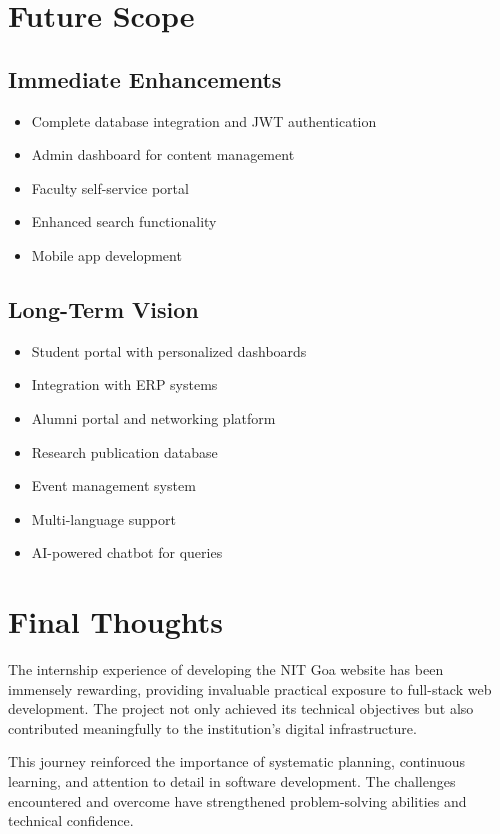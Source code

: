 \documentclass[12pt,a4paper]{report}
\begin{document}
\section{Future Scope}

\subsection*{Immediate Enhancements}
\begin{itemize}
    \item Complete database integration and JWT authentication
    \item Admin dashboard for content management
    \item Faculty self-service portal
    \item Enhanced search functionality
    \item Mobile app development
\end{itemize}

\subsection*{Long-Term Vision}
\begin{itemize}
    \item Student portal with personalized dashboards
    \item Integration with ERP systems
    \item Alumni portal and networking platform
    \item Research publication database
    \item Event management system
    \item Multi-language support
    \item AI-powered chatbot for queries
\end{itemize}

\section{Final Thoughts}

The internship experience of developing the NIT Goa website has been immensely rewarding, providing invaluable practical exposure to full-stack web development. The project not only achieved its technical objectives but also contributed meaningfully to the institution's digital infrastructure.

\vspace{0.5cm}

This journey reinforced the importance of systematic planning, continuous learning, and attention to detail in software development. The challenges encountered and overcome have strengthened problem-solving abilities and technical confidence.
\end{document}
